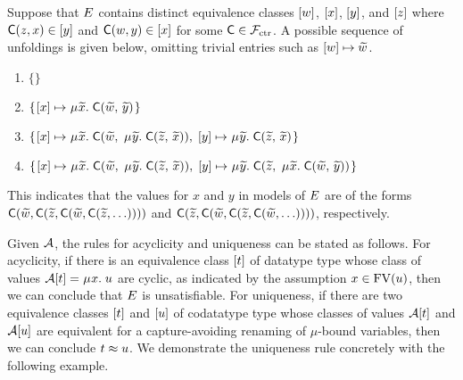 \begin{examplex}
Suppose that $E$ contains distinct equivalence classes $[w]$, $[x]$, $[y]$, and $[z]$
where $\textsf{C}(z,x) \in [y]$ and $\textsf{C}(w,y) \in [x]$ for some $\textsf{C} \in \mathcal{F}_{\mathrm{ctr}}$.
A possible sequence of unfoldings is given below, omitting
trivial entries such as $[w] \mapsto {\widetilde{w}}$.
%
\begin{enumerate}
\item \noindent{}$\{  \}$
\item \noindent{}$\{\vthinspace  \ec{x} \mapsto \MU {\Varec{x}}.\; \const{C}( {\Varec{w}},\, {\Varec{y}} ) \vthinspace\}$
\item \noindent{}$\{\vthinspace  \ec{x} \mapsto \MU {\Varec{x}}.\; \const{C}( {\Varec{w}},\; \MU {\Varec{y}}.\; \const{C}( {\Varec{z}},\, {\Varec{x}} ) ),\;
  \ec{y} \mapsto \MU {\Varec{y}}.\; \const{C}( {\Varec{z}},\, {\Varec{x}} ) \vthinspace\}$
\item \noindent{}$\{\vthinspace  \ec{x} \mapsto \MU {\Varec{x}}.\; \const{C}( {\Varec{w}},\; \MU {\Varec{y}}.\; \const{C}( {\Varec{z}},\, {\Varec{x}} ) ),\;
  \ec{y} \mapsto \MU {\Varec{y}}.\; \const{C}( {\Varec{z}},\; \MU {\Varec{x}}.\; \const{C}( {\Varec{w}},\, {\Varec{y}} ) ) \vthinspace\}$
\end{enumerate}
%
This indicates that the values for $x$ and $y$ in models of $E$
are of the forms $\textsf{C}( {\widetilde{w}}, \textsf{C}( {\widetilde{z}}, \textsf{C}( {\widetilde{w}},\allowbreak \textsf{C}( {\widetilde{z}},\ldots ))))$
and $\textsf{C}( {\widetilde{z}}, \textsf{C}( {\widetilde{w}}, \textsf{C}( {\widetilde{z}}, \textsf{C}( {\widetilde{w}}, \ldots ))))$,
respectively. %
\xend
\end{examplex}

Given $\mathcal{A}$, the rules for acyclicity and uniqueness can be stated as follows.
For acyclicity, if there is an equivalence class $[t]$ of datatype type whose class of values $\Val \ec{t} = \MU x.\; u$ are cyclic,
as indicated by the assumption $x \in \mathrm{FV}( u )$,
then we can conclude that $E$ is unsatisfiable.
For uniqueness, if there are two equivalence classes $[t]$ and $[u]$
of codatatype type whose classes of values $\mathcal{A} [t]$ and $\mathcal{A} [u]$ are equivalent for a capture-avoiding renaming of $\mu$-bound variables,
then we can conclude $t \approx u$.
We demonstrate the uniqueness rule concretely with the following example.


